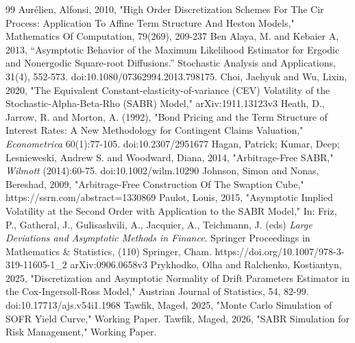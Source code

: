 \documentclass[12pt,oneside]{article}
\numberwithin{equation}{section}
\begin{document}
\begin{thebibliography}{99}
        Aurélien, Alfonsi, 2010, "High Order Discretization Schemes
        For The Cir Process: Application
        To Affine Term Structure And Heston Models,"
        Mathematics Of Computation, 79(269), 209-237
        Ben Alaya, M. and Kebaier A, 2013, “Asymptotic Behavior of the Maximum Likelihood Estimator for Ergodic and Nonergodic Square-root Diffusions.” Stochastic Analysis and Applications, 31(4), 552-573. doi:10.1080/07362994.2013.798175.
        Choi, Jaehyuk and Wu, Lixin, 2020, "The Equivalent Constant-elasticity-of-variance (CEV) Volatility
        of the Stochastic-Alpha-Beta-Rho (SABR) Model,"
        arXiv:1911.13123v3
        Heath, D., Jarrow, R. and Morton, A. (1992), "Bond Pricing and the Term Structure of Interest Rates:
        A New Methodology for Contingent Claims Valuation," {\em Econometrica} 60(1):77-105.
        doi:10.2307/2951677
        Hagan, Patrick; Kumar, Deep; Lesnieweski, Andrew S. and Woodward, Diana, 2014,
        "Arbitrage-Free SABR," {\em Wilmott} (2014):60-75. doi:10.1002/wilm.10290
        Johnson, Simon and Nonas, Bereshad, 2009, "Arbitrage-Free Construction Of The Swaption Cube,"
        https://ssrn.com/abstract=1330869
        Paulot, Louis, 2015, "Asymptotic Implied Volatility at the Second Order with
        Application to the SABR Model," In: Friz, P., Gatheral, J., Gulisashvili,
        A., Jacquier, A., Teichmann, J. (eds) {\em
        Large Deviations and Asymptotic Methods in Finance}.
        Springer Proceedings in Mathematics \& Statistics, (110)
        Springer, Cham. https://doi.org/10.1007/978-3-319-11605-1\_2
        arXiv:0906.0658v3
        Prykhodko, Olha and Ralchenko, Kostiantyn, 2025, "Discretization and Asymptotic Normality of Drift Parameters Estimator
        in the Cox-Ingersoll-Ross Model," Austrian Journal of Statistics, 54, 82-99. doi:10.17713/ajs.v54i1.1968
        Tawfik, Maged, 2025, "Monte Carlo Simulation of SOFR Yield Curve," Working Paper.
        Tawfik, Maged, 2026, "SABR Simulation for Risk Management," Working Paper.
\end{thebibliography}
\end{document}
